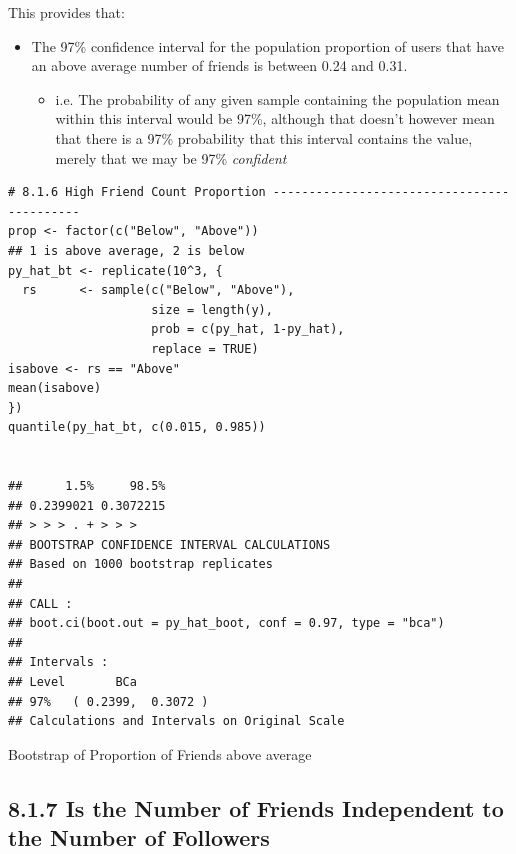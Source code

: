 \documentclass[11pt]{article}
\begin{document}
This provides that:
\begin{itemize}
\item The 97\% confidence interval for the population proportion of users that have an above average number of friends is between 0.24 and 0.31.
\begin{itemize}
\item i.e. The probability of any given sample containing the population mean within this interval would be 97\%, although  that doesn't however mean that there is a 97\% probability that this interval contains the value, merely that we may be 97\% \emph{confident}
\end{itemize}
\end{itemize}

\begin{listing}[htbp]
\begin{verbatim}
# 8.1.6 High Friend Count Proportion -------------------------------------------
prop <- factor(c("Below", "Above"))
## 1 is above average, 2 is below
py_hat_bt <- replicate(10^3, {
  rs      <- sample(c("Below", "Above"),
                    size = length(y),
                    prob = c(py_hat, 1-py_hat),
                    replace = TRUE)
isabove <- rs == "Above"
mean(isabove)
})
quantile(py_hat_bt, c(0.015, 0.985))


##      1.5%     98.5%
## 0.2399021 0.3072215
## > > > . + > > >
## BOOTSTRAP CONFIDENCE INTERVAL CALCULATIONS
## Based on 1000 bootstrap replicates
##
## CALL :
## boot.ci(boot.out = py_hat_boot, conf = 0.97, type = "bca")
##
## Intervals :
## Level       BCa
## 97%   ( 0.2399,  0.3072 )
## Calculations and Intervals on Original Scale
\end{verbatim}
\caption{\label{org8f4cb9c}Bootstrap of Proportion of Friends above average}
\end{listing}
\subsection{8.1.7 Is the Number of Friends Independent to the Number of Followers}
\label{sec:org42efe0d}
\end{document}
